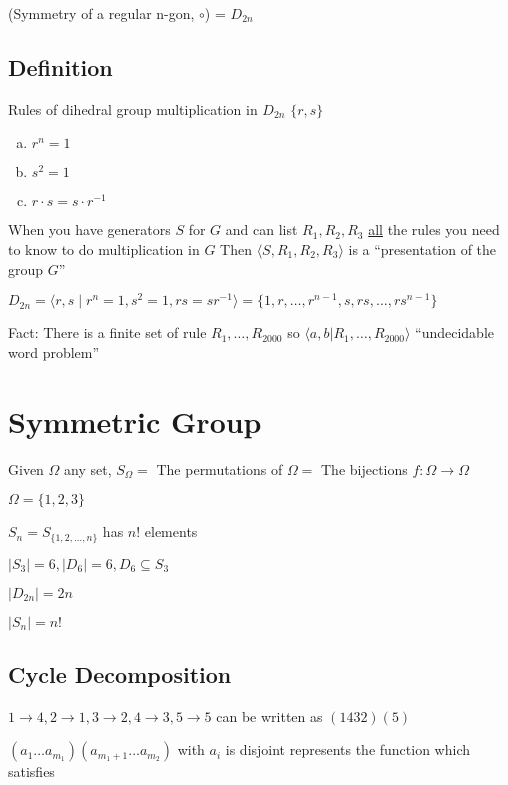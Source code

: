 (Symmetry of a regular n-gon, $\circ$) = $D_{2n}$

\subsection{Definition}

Rules of dihedral group multiplication in $D_{2n}$
$\{r, s\}$

\begin{enumerate}[a)]
  \item $r^n = 1$
  \item $s^2 = 1$
  \item $r \cdot s = s \cdot r^{-1}$
\end{enumerate}

When you have generators $S$ for $G$ and can list $R_1, R_2, R_3$ 
\underline{all} the rules you need to know to do multiplication in $G$
Then $\langle S, R_1, R_2, R_3\rangle$ is a ``presentation of the group $G$''

$D_{2n} = \langle r, s \mid r^n = 1, s^2 = 1, rs = sr^{-1}\rangle = \{1, r, \dotsc, r^{n-1}, s, rs, \dotsc, rs^{n-1}\}$

Fact: There is a finite set of rule $R_1, \dotsc, R_{2000}$
so $\langle a, b|R_1, \dotsc, R_{2000}\rangle$ ``undecidable word problem''

\section{Symmetric Group}

Given $\Omega$ any set, $S_\Omega = $ The permutations of $\Omega =$ The bijections $f: \Omega \to \Omega$

\begin{example}
  $\Omega = \{1, 2, 3\}$ 

  $S_n = S_{\{1, 2, \dotsc, n\}}$ has $n!$ elements

  $|S_3| = 6, |D_6| = 6, D_6 \subseteq S_3$

  $|D_{2n}| = 2n$

  $|S_n| = n!$
\end{example}

\subsection{Cycle Decomposition}

$1 \to 4, 2 \to 1, 3 \to 2, 4 \to 3, 5 \to 5$ can be written as
$(1432)(5)$

$(a_1 \dotsc a_{m_1})(a_{m_1+1} \dotsc a_{m_2})$ with $a_i$ is disjoint
represents the function which satisfies


